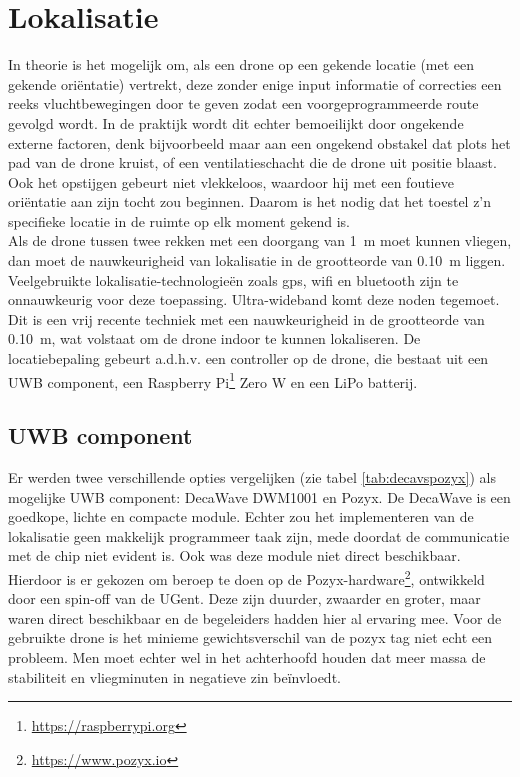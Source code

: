 \section{Lokalisatie} \label{sec:localization}
In theorie is het mogelijk om, als een drone op een gekende locatie (met een gekende oriëntatie) vertrekt, deze zonder enige input informatie of correcties een reeks vluchtbewegingen door te geven zodat een voorgeprogrammeerde route gevolgd wordt.
In de praktijk wordt dit echter bemoeilijkt door ongekende externe factoren, denk bijvoorbeeld maar aan een ongekend obstakel dat plots het pad van de drone kruist, of een ventilatieschacht die de drone uit positie blaast.
Ook het opstijgen gebeurt niet vlekkeloos, waardoor hij met een foutieve oriëntatie aan zijn tocht zou beginnen.
Daarom is het nodig dat het toestel z'n specifieke locatie in de ruimte op elk moment gekend is.\\

Als de drone tussen twee rekken met een doorgang van \SI{1}{\m} moet kunnen vliegen, dan moet de nauwkeurigheid van lokalisatie in de grootteorde van \SI{0.10}{\m} liggen.
Veelgebruikte lokalisatie-technologieën zoals gps, wifi en bluetooth zijn te onnauwkeurig voor deze toepassing.
Ultra-wideband komt deze noden tegemoet.
Dit is een vrij recente techniek met een nauwkeurigheid in de grootteorde van \SI{0.10}{\m}, wat volstaat om de drone indoor te kunnen lokaliseren.
De locatiebepaling gebeurt a.d.h.v. een controller op de drone, die bestaat uit een UWB component, een Raspberry Pi\footnote{\url{https://raspberrypi.org}} Zero W en een LiPo batterij.\\

\subsection{UWB component} \label{sec:uwb}
Er werden twee verschillende opties vergelijken (zie tabel \ref{tab:decavspozyx}) als mogelijke UWB component: DecaWave DWM1001 en Pozyx.
De DecaWave is een goedkope, lichte en compacte module.
Echter zou het implementeren van de lokalisatie geen makkelijk programmeer taak zijn, mede doordat de communicatie met de chip niet evident is.
Ook was deze module niet direct beschikbaar. Hierdoor is er gekozen om beroep te doen op de Pozyx-hardware\footnote{\url{https://www.pozyx.io}}, ontwikkeld door een spin-off van de UGent. Deze zijn duurder, zwaarder en groter, maar waren direct beschikbaar en de begeleiders hadden hier al ervaring mee.
Voor de gebruikte drone is het minieme gewichtsverschil van de pozyx tag niet echt een probleem.
Men moet echter wel in het achterhoofd houden dat meer massa de stabiliteit en vliegminuten in negatieve zin beïnvloedt.\\


